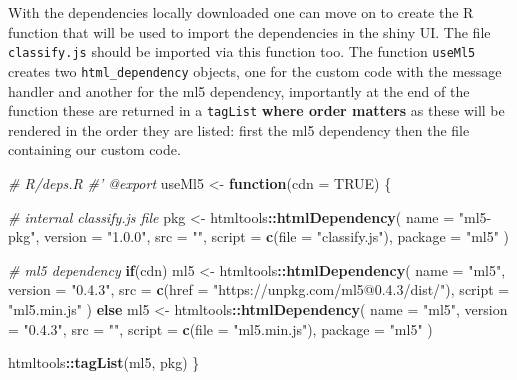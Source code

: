 \documentclass[10pt,]{krantz}
\makeatletter
\newenvironment{Shaded}{\begin{snugshade}}{\end{snugshade}}
\newcommand{\CommentTok}[1]{\textcolor[rgb]{0.37,0.37,0.37}{\textit{#1}}}
\newcommand{\ControlFlowTok}[1]{\textcolor[rgb]{0.27,0.27,0.27}{\textbf{#1}}}
\newcommand{\DataTypeTok}[1]{\textcolor[rgb]{0.27,0.27,0.27}{#1}}
\newcommand{\KeywordTok}[1]{\textcolor[rgb]{0.27,0.27,0.27}{\textbf{#1}}}
\newcommand{\NormalTok}[1]{#1}
\newcommand{\OperatorTok}[1]{\textcolor[rgb]{0.43,0.43,0.43}{\textbf{#1}}}
\newcommand{\OtherTok}[1]{\textcolor[rgb]{0.37,0.37,0.37}{#1}}
\newcommand{\StringTok}[1]{\textcolor[rgb]{0.5,0.5,0.5}{#1}}
\newenvironment{kframe}{%
\medskip{}
\setlength{\fboxsep}{.8em}
 \def\at@end@of@kframe{}%
 \ifinner\ifhmode%
  \def\at@end@of@kframe{\end{minipage}}%
  \begin{minipage}{\columnwidth}%
 \fi\fi%
 \def\FrameCommand##1{\hskip\@totalleftmargin \hskip-\fboxsep
 \colorbox{shadecolor}{##1}\hskip-\fboxsep
     \hskip-\linewidth \hskip-\@totalleftmargin \hskip\columnwidth}%
 \MakeFramed {\advance\hsize-\width
   \@totalleftmargin\z@ \linewidth\hsize
   \@setminipage}}%
 {\par\unskip\endMakeFramed%
 \at@end@of@kframe}
\renewenvironment{Shaded}{\begin{kframe}}{\end{kframe}}
\makeatother
\begin{document}
With the dependencies locally downloaded one can move on to create the R function that will be used to import the dependencies in the shiny UI. The file \texttt{classify.js} should be imported via this function too. The function \texttt{useMl5} creates two \texttt{html\_dependency} objects, one for the custom code with the message handler and another for the ml5 dependency, importantly at the end of the function these are returned in a \texttt{tagList} \textbf{where order matters} as these will be rendered in the order they are listed: first the ml5 dependency then the file containing our custom code.

\begin{Shaded}
\begin{Highlighting}[]
\CommentTok{# R/deps.R}
\CommentTok{#' @export}
\NormalTok{useMl5 <-}\StringTok{ }\ControlFlowTok{function}\NormalTok{(}\DataTypeTok{cdn =} \OtherTok{TRUE}\NormalTok{) \{}

  \CommentTok{# internal classify.js file}
\NormalTok{  pkg <-}\StringTok{ }\NormalTok{htmltools}\OperatorTok{::}\KeywordTok{htmlDependency}\NormalTok{(}
    \DataTypeTok{name =} \StringTok{"ml5-pkg"}\NormalTok{,}
    \DataTypeTok{version =} \StringTok{"1.0.0"}\NormalTok{,}
    \DataTypeTok{src =} \StringTok{""}\NormalTok{,}
    \DataTypeTok{script =} \KeywordTok{c}\NormalTok{(}\DataTypeTok{file =} \StringTok{"classify.js"}\NormalTok{),}
    \DataTypeTok{package =} \StringTok{"ml5"}
\NormalTok{  )}

  \CommentTok{# ml5 dependency}
  \ControlFlowTok{if}\NormalTok{(cdn)}
\NormalTok{    ml5 <-}\StringTok{ }\NormalTok{htmltools}\OperatorTok{::}\KeywordTok{htmlDependency}\NormalTok{(}
      \DataTypeTok{name =} \StringTok{"ml5"}\NormalTok{,}
      \DataTypeTok{version =} \StringTok{"0.4.3"}\NormalTok{,}
      \DataTypeTok{src =} \KeywordTok{c}\NormalTok{(}\DataTypeTok{href =} \StringTok{"https://unpkg.com/ml5@0.4.3/dist/"}\NormalTok{),}
      \DataTypeTok{script =} \StringTok{"ml5.min.js"}
\NormalTok{    )}
  \ControlFlowTok{else} 
\NormalTok{    ml5 <-}\StringTok{ }\NormalTok{htmltools}\OperatorTok{::}\KeywordTok{htmlDependency}\NormalTok{(}
      \DataTypeTok{name =} \StringTok{"ml5"}\NormalTok{,}
      \DataTypeTok{version =} \StringTok{"0.4.3"}\NormalTok{,}
      \DataTypeTok{src =} \StringTok{""}\NormalTok{,}
      \DataTypeTok{script =} \KeywordTok{c}\NormalTok{(}\DataTypeTok{file =} \StringTok{"ml5.min.js"}\NormalTok{),}
      \DataTypeTok{package =} \StringTok{"ml5"}
\NormalTok{    )}

\NormalTok{  htmltools}\OperatorTok{::}\KeywordTok{tagList}\NormalTok{(ml5, pkg)}
\NormalTok{\}}
\end{Highlighting}
\end{Shaded}
\end{document}

